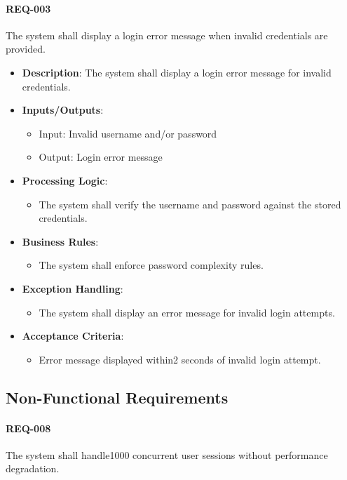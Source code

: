 \documentclass{article}
\begin{document}
\paragraph{REQ-003}
The system shall display a login error message when invalid credentials are provided.

\begin{itemize}
 \item \textbf{Description}: The system shall display a login error message for invalid credentials.
 \item \textbf{Inputs/Outputs}:
 \begin{itemize}
 \item Input: Invalid username and/or password
 \item Output: Login error message
 \end{itemize}
 \item \textbf{Processing Logic}:
 \begin{itemize}
 \item The system shall verify the username and password against the stored credentials.
 \end{itemize}
 \item \textbf{Business Rules}:
 \begin{itemize}
 \item The system shall enforce password complexity rules.
 \end{itemize}
 \item \textbf{Exception Handling}:
 \begin{itemize}
 \item The system shall display an error message for invalid login attempts.
 \end{itemize}
 \item \textbf{Acceptance Criteria}:
 \begin{itemize}
 \item Error message displayed within2 seconds of invalid login attempt.
 \end{itemize}
\end{itemize}

\subsection{Non-Functional Requirements}

\paragraph{REQ-008}
The system shall handle1000 concurrent user sessions without performance degradation.
\end{document}
